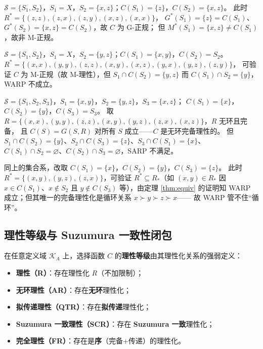 \begin{example}[G-正规而非 M-正规]\label{ex:GnotM}
$\mathcal{S}=\{S_1,S_2\}$，$S_1=X$，$S_2=\{x,z\}$；$C(S_1)=\{z\}$，$C(S_2)=\{x,z\}$。
此时 $R^*=\{(z,z),(z,x),(z,y),(x,z),(x,x)\}$，
$G^*(S_1)=\{z\}=C(S_1)$、$G^*(S_2)=\{x,z\}=C(S_2)$，故 $C$ 为 G-正规；
但 $M^*(S_1)=\{x,z\}\neq C(S_1)$，故非 M-正规。
\end{example}

\begin{example}\label{ex:MnotWARP}
$\mathcal{S}=\{S_1,S_2\}$，$S_1=X$，$S_2=\{y,z\}$；$C(S_1)=\{x,y\}$，$C(S_2)=S_2$。
$R^*=\{(x,x),(y,y),(z,z),(x,y),(x,z),(y,x),(y,z),(z,y)\}$，
可验证 $C$ 为 M-正规（故 M-理性），但
$S_1\cap C(S_2)=\{y,z\}$ 而 $C(S_1)\cap S_2=\{y\}$，WARP 不成立。
\end{example}

\begin{example}\label{ex:ARnotSARP}
$\mathcal{S}=\{S_1,S_2,S_3\}$，$S_1=\{x,y\}$，$S_2=\{y,z\}$，$S_3=\{x,z\}$；
$C(S_1)=\{x\}$，$C(S_2)=\{y\}$，$C(S_3)=S_3$。
取 $R=\{(x,x),(y,y),(z,z),(x,y),(y,z),(z,x),(x,z)\}$，$R$ 无环且完备，
且 $C(S)=G(S,R)$ 对所有 $S$ 成立——$C$ 是无环完备理性的。
但 $S_1\cap C(S_2)=\{y\}$、$S_2\cap C(S_3)=\{z\}$、$S_3\cap C(S_1)=\{x\}$、
$C(S_1)\cap S_2=\varnothing$、$C(S_2)\cap S_3=\varnothing$，SARP 不满足。
\end{example}

\begin{example}\label{ex:WARPnotAR}
同上的集合系，改取 $C(S_1)=\{x\}$，$C(S_2)=\{y\}$，$C(S_3)=\{z\}$。
此时 $R^*=\{(x,y),(y,z),(z,x)\}$，可验证 $R^*\subseteq R_*$（如 $(x,y)\in R_*$
因 $x\in C(S_1)$、$x\notin S_2$ 且 $y\notin C(S_3)$ 等），由定理 \ref{thm:equiv}
的证明知 WARP 成立；但其唯一的完备理性化是循环关系 $x\succ y\succ z\succ x$——
故 WARP 管不住“循环”。
\end{example}

\subsection{理性等级与 Suzumura 一致性闭包}

在任意定义域 $\mathcal{K}_A$ 上，选择函数 $C$ 的\textbf{理性等级}由其理性化关系的强弱定义：

\begin{itemize}
  \item \textbf{理性（R）}：存在理性化 $R$（不加限制）；
  \item \textbf{无环理性（AR）}：存在\textbf{无环}理性化；
  \item \textbf{拟传递理性（QTR）}：存在\textbf{拟传递}理性化；
  \item \textbf{Suzumura 一致理性（SCR）}：存在 \textbf{Suzumura 一致}理性化；
  \item \textbf{完全理性（FR）}：存在是\textbf{序}（完备+传递）的理性化。
\end{itemize}

